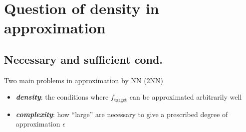 \documentclass[aspectratio=32]{beamer}
\begin{document}






\section{Question of density in approximation}

\subsection{Necessary and sufficient cond.}

\begin{frame}{Two main problems in approximation by NN (2NN)}
    \begin{itemize}
        \item \textit{\textbf{density}}: the conditions where
        $f_{\text{target}}$ can be approximated arbitrarily well
        \item \textit{\textbf{complexity}}: how ``large'' are necessary to give
        a prescribed degree of approximation $\epsilon$
    \end{itemize}
    
\end{frame}
\end{document}

